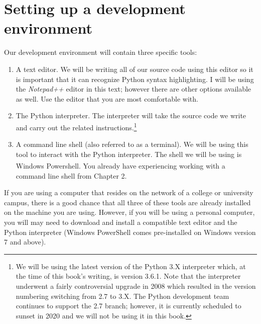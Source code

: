 \documentclass{book}
\begin{document}
\section{Setting up a development environment}
Our development environment will contain three specific tools:
\begin{enumerate}
	\item A text editor. We will be writing all of our source code using this editor so it is important that it can recognize Python syntax highlighting. I will be using the \textit{Notepad++} editor in this text; however there are other options available as well. Use the editor that you are most comfortable with. 
	\item The Python interpreter. The interpreter will take the source code we write and carry out the related instructions.\footnote{We will be using the latest version of the Python 3.X interpreter which, at the time of this book's writing, is version 3.6.1. Note that the interpreter underwent a fairly controversial upgrade in 2008 which resulted in the version numbering switching from 2.7 to 3.X. The Python development team continues to support the 2.7 branch; however, it is currently scheduled to sunset in 2020 and we will not be using it in this book.}
	\item A command line shell (also referred to as a terminal). We will be using this tool to interact with the Python interpreter. The shell we will be using is Windows Powershell\textsuperscript{\textregistered}. You already have experiencing working with a command line shell from Chapter 2.
\end{enumerate}

If you are using a computer that resides on the network of a college or university campus, there is a good chance that all three of these tools are already installed on the machine you are using. However, if you will be using a personal computer, you will may need to download and install a compatible text editor and the Python interpreter (Windows PowerShell comes pre-installed on Windows version 7 and above).
\end{document}

